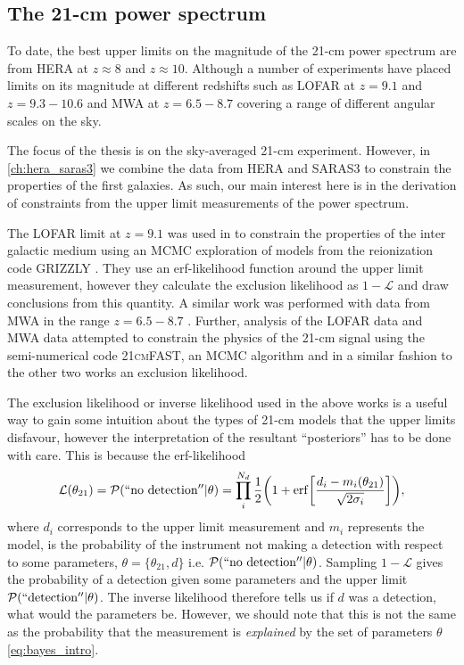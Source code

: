 \subsection{The 21-cm power spectrum}

To date, the best upper limits on the magnitude of the 21-cm power spectrum are from HERA at $z\approx8$ and $z\approx10$. Although a number of experiments have placed limits on its magnitude at different redshifts such as LOFAR at $z=9.1$ and $z=9.3-10.6$ and MWA at $z=6.5-8.7$ covering a range of different angular scales on the sky. 

The focus of the thesis is on the sky-averaged 21-cm experiment. However, in \cref{ch:hera_saras3} we combine the data from HERA and SARAS3 to constrain the properties of the first galaxies. As such, our main interest here is in the derivation of constraints from the upper limit measurements of the power spectrum.

The LOFAR limit at $z=9.1$ was used in \cite{Ghara_LOFAR_2020} to constrain the properties of the inter galactic medium using an MCMC exploration of models from the reionization code \textsc{GRIZZLY} \cite{GharaGRIZZLYa, GharaGRIZZLYb}. They use an erf-likelihood function around the upper limit measurement, however they calculate the exclusion likelihood as $1 - \mathcal{L}$ and draw conclusions from this quantity. A similar work was performed with data from MWA in the range $z=6.5 - 8.7$ \cite{Ghara_MWA_2021}. Further, analysis of the LOFAR data \cite{Greig_LOFAR_2021} and MWA data \cite{Greig_MWA_2020} attempted to constrain the physics of the 21-cm signal using the semi-numerical code \textsc{21cmFAST}, an MCMC algorithm and in a similar fashion to the other two works an exclusion likelihood.

The exclusion likelihood or inverse likelihood used in the above works is a useful way to gain some intuition about the types of 21-cm models that the upper limits disfavour, however the interpretation of the resultant ``posteriors'' has to be done with care. This is because the erf-likelihood
\begin{equation}
    \mathcal{L}(\theta_{21}) = \mathcal{P}(\mathrm{``no~detection''}|\theta) = \prod_i^{N_d}\frac{1}{2}\bigg(1 + \mathrm{erf}\bigg[\frac{d_i - m_i(\theta_{21})}{\sqrt{2\sigma_i}}\bigg]\bigg),
    \label{eq:erf_likelihood}
\end{equation}
where $d_i$ corresponds to the upper limit measurement and $m_i$ represents the model, is the probability of the instrument not making a detection with respect to some parameters, $\theta = \{\theta_{21}, d\}$ i.e. $\mathcal{P}(\mathrm{``no~detection''}|\theta)$. Sampling $1-\mathcal{L}$ gives the probability of a detection given some parameters and the upper limit $\mathcal{P}(\mathrm{``detection''}|\theta)$. The inverse likelihood therefore tells us if $d$ was a detection, what would the parameters be. However, we should note that this is not the same as the probability that the measurement is \textit{explained} by the set of parameters $\theta$ \cref{eq:bayes_intro}. 

